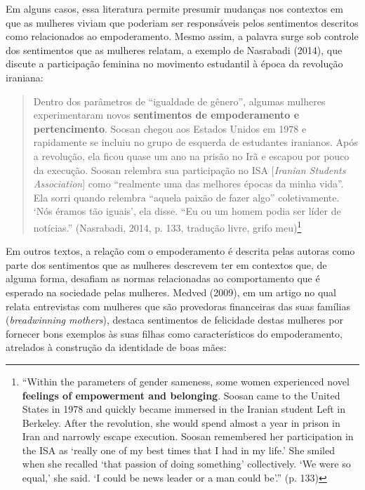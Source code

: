 Em alguns casos, essa literatura permite presumir mudanças nos contextos em que as mulheres viviam que poderiam ser responsáveis pelos sentimentos descritos como relacionados ao empoderamento. Mesmo assim, a palavra surge sob controle dos sentimentos que as mulheres relatam, a exemplo de Nasrabadi (2014), que discute a participação feminina no movimento estudantil à época da revolução iraniana:

\begin{quote}
    Dentro dos parâmetros de “igualdade de gênero”, algumas mulheres experimentaram novos \textbf{sentimentos de empoderamento e pertencimento}. Soosan chegou aos Estados Unidos em 1978 e rapidamente se incluiu no grupo de esquerda de estudantes iranianos. Após a revolução, ela ficou quase um ano na prisão no Irã e escapou por pouco da execução. Soosan relembra sua participação no ISA [\textit{Iranian Students Association}] como “realmente uma das melhores épocas da minha vida”. Ela sorri quando relembra “aquela paixão de fazer algo” coletivamente. ‘Nós éramos tão iguais’, ela disse. “Eu ou um homem podia ser líder de notícias.” (Nasrabadi, 2014, p. 133, tradução livre, grifo meu)\footnote{“Within the parameters of gender sameness, some women experienced novel \textbf{feelings of empowerment and belonging}. Soosan came to the United States in 1978 and quickly became immersed in the Iranian student Left in Berkeley. After the revolution, she would spend almost a year in prison in Iran and narrowly escape execution. Soosan remembered her participation in the ISA as ‘really one of my best times that I had in my life.’ She smiled when she recalled ‘that passion of doing something’ collectively. ‘We were so equal,’ she said. ‘I could be news leader or a man could be’.” (p. 133)}
\end{quote}

Em outros textos, a relação com o empoderamento é descrita pelas autoras como parte dos sentimentos que as mulheres descrevem ter em contextos que, de alguma forma, desafiam as normas relacionadas ao comportamento que é esperado na sociedade pelas mulheres. Medved (2009), em um artigo no qual relata entrevistas com mulheres que são provedoras financeiras das suas famílias (\textit{breadwinning mothers}), destaca sentimentos de felicidade destas mulheres por fornecer bons exemplos às suas filhas como característicos do empoderamento, atrelados à construção da identidade de boas mães:

